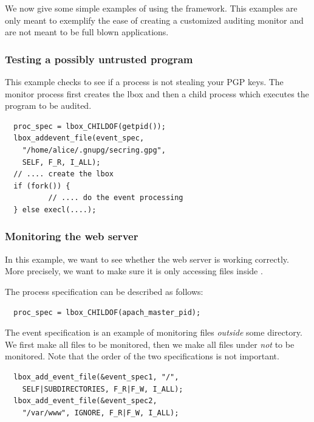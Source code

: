 We now give some simple examples of using the framework.
This examples are only meant to exemplify the ease of creating
a customized auditing monitor and are not meant to be full blown applications.

\subsubsection{Testing a possibly untrusted program}

This example checks to see if a process is not stealing your PGP keys.
The monitor process first creates the lbox and then a child process
which executes the program to be audited.

{
\small
\begin{verbatim}
  proc_spec = lbox_CHILDOF(getpid());
  lbox_addevent_file(event_spec,
    "/home/alice/.gnupg/secring.gpg",
    SELF, F_R, I_ALL);
  // .... create the lbox
  if (fork()) {
          // .... do the event processing
  } else execl(....);
\end{verbatim}
}



\subsubsection{Monitoring the web server}

In this example, we want to see whether the web server is working correctly.
More precisely, we want to make sure it is only accessing files inside
.

The process specification can be described as follows:
{
\small
\begin{verbatim}
  proc_spec = lbox_CHILDOF(apach_master_pid);
\end{verbatim}
}
\noindent
The event specification is an example of
monitoring files {\em outside} some directory.
We first make all files to be monitored, then we make
all files under  {\em not} to be monitored.
Note that the order of the two specifications is not important.
{
\small
\begin{verbatim}
  lbox_add_event_file(&event_spec1, "/",
    SELF|SUBDIRECTORIES, F_R|F_W, I_ALL);
  lbox_add_event_file(&event_spec2,
    "/var/www", IGNORE, F_R|F_W, I_ALL);
\end{verbatim}
}

